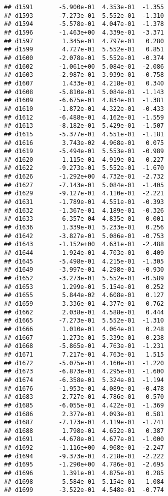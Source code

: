 \documentclass[
]{article}
\begin{document}
\begin{verbatim}
## d1591       -5.900e-01  4.353e-01  -1.355
## d1593       -7.273e-01  5.552e-01  -1.310
## d1594       -5.578e-01  4.047e-01  -1.378
## d1596       -1.463e+00  4.339e-01  -3.371
## d1597        1.345e-01  4.797e-01   0.280
## d1599        4.727e-01  5.552e-01   0.851
## d1600       -2.078e-01  5.552e-01  -0.374
## d1602       -1.061e+00  5.084e-01  -2.086
## d1603       -2.987e-01  3.939e-01  -0.758
## d1607        1.433e-01  4.218e-01   0.340
## d1608       -5.810e-01  5.084e-01  -1.143
## d1609       -6.675e-01  4.834e-01  -1.381
## d1610       -1.872e-01  4.322e-01  -0.433
## d1612       -6.488e-01  4.162e-01  -1.559
## d1613       -8.182e-01  5.429e-01  -1.507
## d1615       -5.377e-01  4.551e-01  -1.181
## d1616        3.743e-02  4.968e-01   0.075
## d1619       -5.494e-01  5.553e-01  -0.989
## d1620        1.115e-01  4.919e-01   0.227
## d1622       -9.273e-01  5.552e-01  -1.670
## d1626       -1.292e+00  4.732e-01  -2.732
## d1627       -7.143e-01  5.084e-01  -1.405
## d1629       -9.127e-01  4.110e-01  -2.221
## d1631       -1.789e-01  4.551e-01  -0.393
## d1632       -1.367e-01  4.189e-01  -0.326
## d1633        6.357e-04  4.835e-01   0.001
## d1636        1.339e-01  5.233e-01   0.256
## d1642       -3.827e-01  5.086e-01  -0.753
## d1643       -1.152e+00  4.631e-01  -2.488
## d1644        1.924e-01  4.703e-01   0.409
## d1645       -5.498e-01  4.215e-01  -1.305
## d1649       -3.997e-01  4.298e-01  -0.930
## d1652       -3.273e-01  5.552e-01  -0.589
## d1653        1.299e-01  5.154e-01   0.252
## d1655        5.844e-02  4.608e-01   0.127
## d1659        3.336e-01  4.377e-01   0.762
## d1662        2.038e-01  4.588e-01   0.444
## d1665       -7.273e-01  5.552e-01  -1.310
## d1666        1.010e-01  4.064e-01   0.248
## d1667       -1.273e-01  5.339e-01  -0.238
## d1668       -5.865e-01  4.763e-01  -1.231
## d1671        7.217e-01  4.763e-01   1.515
## d1672       -5.075e-01  4.160e-01  -1.220
## d1673       -6.873e-01  4.295e-01  -1.600
## d1674       -6.358e-01  5.324e-01  -1.194
## d1676       -1.953e-01  4.089e-01  -0.478
## d1683        2.727e-01  4.786e-01   0.570
## d1685       -6.055e-01  4.422e-01  -1.369
## d1686        2.377e-01  4.093e-01   0.581
## d1687       -7.173e-01  4.119e-01  -1.741
## d1688        1.798e-01  4.652e-01   0.387
## d1691       -4.678e-01  4.677e-01  -1.000
## d1692       -1.116e+00  4.968e-01  -2.247
## d1694       -9.373e-01  4.218e-01  -2.222
## d1695       -1.290e+00  4.786e-01  -2.695
## d1696        1.391e-01  4.875e-01   0.285
## d1698        5.584e-01  5.154e-01   1.084
## d1699       -3.522e-01  4.548e-01  -0.774

\end{verbatim}
\end{document}
